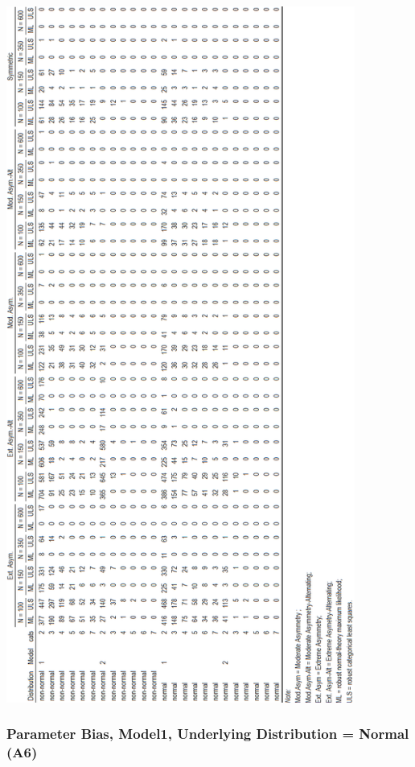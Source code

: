 \documentclass[10,a4paperpaper,]{article}
\begin{document}
\includegraphics[width=325pt]{./figures/tabA4_A5}

\subsubsection{Parameter Bias, Model1, Underlying Distribution = Normal (A6)}
\end{document}
